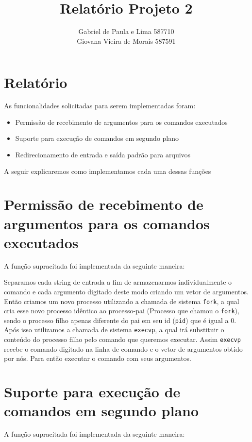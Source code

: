 \documentclass[12pt]{article}
\author{Gabriel de Paula e Lima  587710\\
        Giovana Vieira de Morais  587591}
\title{Relatório Projeto 2}
\begin{document}
\maketitle

\newpage

\section*{Relatório}

As funcionalidades solicitadas para serem implementadas foram:

\begin{itemize}
\item{Permissão de recebimento de argumentos para os comandos executados}
\item{Suporte para execução de comandos em segundo plano}
\item{Redirecionamento de entrada e saída padrão para arquivos}
\end{itemize}

A seguir explicaremos como implementamos cada uma dessas funções

\section*{Permissão de recebimento de argumentos para os comandos executados}
 A função supracitada foi implementada da seguinte maneira:

 Separamos cada string de entrada a fim de armazenarmos individualmente o comando e cada argumento digitado
 deste modo criando um vetor de argumentos.
 Então criamos um novo processo utilizando a chamada de sistema \texttt{fork},
 a qual cria esse novo processo idêntico ao processo-pai (Processo que chamou o \texttt{fork}),
 sendo o processo filho apenas diferente do pai em seu id (\texttt{pid}) que é igual a 0.
 Após isso utilizamos a chamada de sistema \texttt{execvp},
 a qual irá substituir o conteúdo do processo filho pelo comando que queremos executar.
 Assim \texttt{execvp} recebe o comando digitado na linha de comando e o vetor de argumentos obtido por nós.
 Para então executar o comando com seus argumentos.

\section*{Suporte para execução de comandos em segundo plano}
A função supracitada foi implementada da seguinte maneira:
\end{document}
